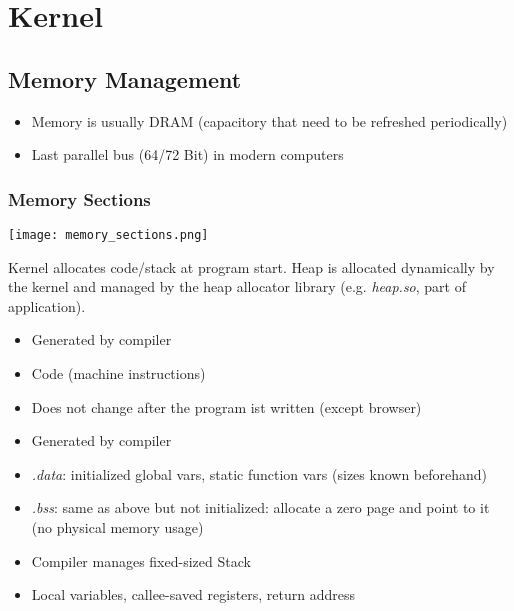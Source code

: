 \section{Kernel}
\subsection{Memory Management}
\begin{itemize}
    \item Memory is usually DRAM (capacitory that need to be refreshed periodically)
    \item Last parallel bus (64/72 Bit) in modern computers
\end{itemize}


\subsubsection{Memory Sections}
\texttt{[image: memory\_sections.png]}

Kernel allocates code/stack at program start. Heap is allocated dynamically by the kernel and managed by the heap allocator library (e.g. \textit{heap.so}, part of application).


\begin{itemize}
    \item Generated by compiler
    \item Code (machine instructions)
    \item Does not change after the program ist written (except browser)
\end{itemize}



\begin{itemize}
    \item Generated by compiler
    \item \textit{.data}: initialized global vars, static function vars (sizes known beforehand)
    \item \textit{.bss}: same as above but not initialized: allocate a zero page and point to it (no physical memory usage)
\end{itemize}


\begin{itemize}
    \item Compiler manages fixed-sized Stack
    \item Local variables, callee-saved registers, return address
\end{itemize}


